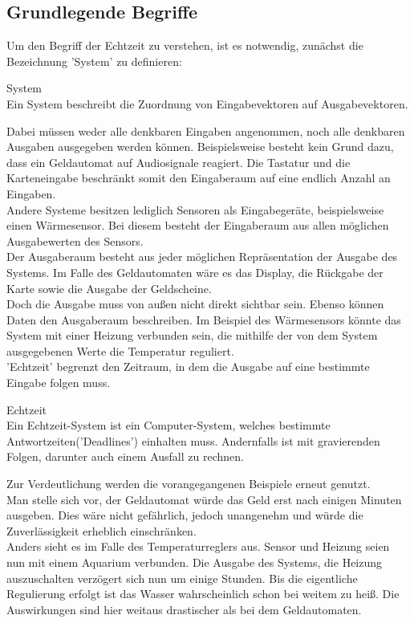 \subsection{Grundlegende Begriffe}\label{2.1}
Um den Begriff der Echtzeit zu verstehen, ist es notwendig, zunächst die Bezeichnung 'System' zu definieren:
\begin{definition}{System}\\
Ein System beschreibt die Zuordnung von Eingabevektoren auf Ausgabevektoren.\cite[p. 3]{RTS}
\end{definition}
Dabei müssen weder alle denkbaren Eingaben angenommen, noch alle denkbaren Ausgaben ausgegeben werden können. Beispielsweise besteht kein Grund dazu, dass ein Geldautomat auf Audiosignale reagiert. Die Tastatur und die Karteneingabe beschränkt somit den Eingaberaum auf eine endlich Anzahl an Eingaben.\\
Andere Systeme besitzen lediglich Sensoren als Eingabegeräte, beispielsweise einen Wärmesensor. Bei diesem besteht der Eingaberaum aus allen möglichen Ausgabewerten des Sensors.\\
\newline
Der Ausgaberaum besteht aus jeder möglichen Repräsentation der Ausgabe des Systems. Im Falle des Geldautomaten wäre es das Display, die Rückgabe der Karte sowie die Ausgabe der Geldscheine.\\
Doch die Ausgabe muss von außen nicht direkt sichtbar sein. Ebenso können Daten den Ausgaberaum beschreiben. Im Beispiel des Wärmesensors könnte das System mit einer Heizung verbunden sein, die mithilfe der von dem System ausgegebenen Werte die Temperatur reguliert.\\
\newline
'Echtzeit' begrenzt den Zeitraum, in dem die Ausgabe auf eine bestimmte Eingabe folgen muss.
\begin{definition}{Echtzeit}\\
Ein Echtzeit-System ist ein Computer-System, welches bestimmte Antwortzeiten('Deadlines') einhalten muss. Andernfalls ist mit gravierenden Folgen, darunter auch einem Ausfall zu rechnen.\cite[p. 5]{RTS}
\end{definition}
Zur Verdeutlichung werden die vorangegangenen Beispiele erneut genutzt.\\
Man stelle sich vor, der Geldautomat würde das Geld erst nach einigen Minuten ausgeben. Dies wäre nicht gefährlich, jedoch unangenehm und würde die Zuverlässigkeit erheblich einschränken.\\
Anders sieht es im Falle des Temperaturreglers aus. Sensor und Heizung seien nun mit einem Aquarium verbunden. Die Ausgabe des Systems, die Heizung auszuschalten verzögert sich nun um einige Stunden. Bis die eigentliche Regulierung erfolgt ist das Wasser wahrscheinlich schon bei weitem zu heiß. Die Auswirkungen sind hier weitaus drastischer als bei dem Geldautomaten.\\
\newline

